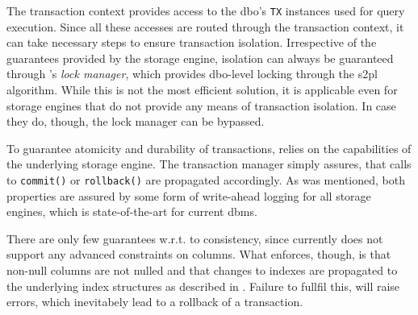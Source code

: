 The transaction context provides access to the \acrshort{dbo}'s \texttt{TX} instances used for query execution. Since all these accesses are routed through the transaction context, it can take necessary steps to ensure transaction isolation. Irrespective of the guarantees provided by the storage engine, isolation can always be guaranteed through \cottontail{}'s \emph{lock manager}, which provides \acrshort{dbo}-level locking through the \acrshort{s2pl} algorithm. While this is not the most efficient solution, it is applicable even for storage engines that do not provide any means of transaction isolation. In case they do, though, the lock manager can be bypassed.

To guarantee atomicity and durability of transactions, \cottontail{} relies on the capabilities of the underlying storage engine. The transaction manager simply assures, that calls to \texttt{commit()} or \texttt{rollback()} are propagated accordingly. As was mentioned, both properties are assured by some form of write-ahead logging for all storage engines, which is state-of-the-art for current \acrshort{dbms}.

There are only few guarantees w.r.t. to consistency, since \cottontail{} currently does not support any advanced constraints on columns. What \cottontail{} enforces, though, is that non-null columns are not nulled and that changes to indexes are propagated to the underlying index structures as described in . Failure to fullfil this, will raise errors, which inevitabely lead to a rollback of a transaction.